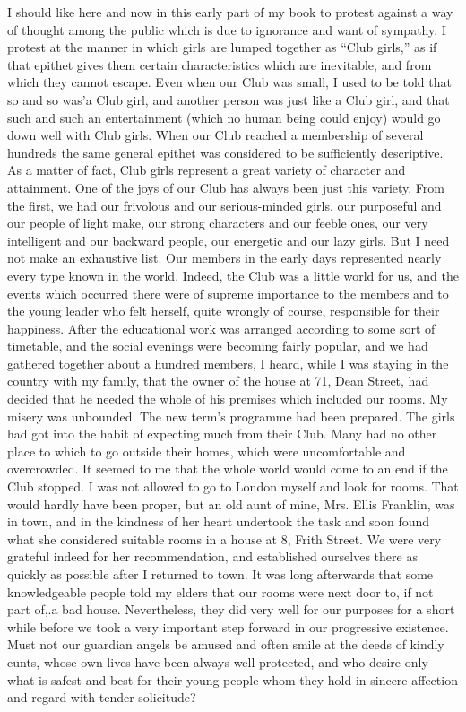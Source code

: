 I should like here and now in this early part of my
book to protest against a way of thought among the public
which is due to ignorance and want of sympathy. I protest at the manner in which girls are lumped together as
“Club girls,” as if that epithet gives them certain characteristics
which are inevitable, and from which they cannot
escape. Even when our Club was small, I used to be told
that so and so was’a Club girl, and another person was
just like a Club girl, and that such and such an entertainment
(which no human being could enjoy) would go
down well with Club girls. When our Club reached a
membership of several hundreds the same general epithet
was considered to be sufficiently descriptive. As a matter
of fact, Club girls represent a great variety of character
and attainment. One of the joys of our Club has always
been just this variety. From the first, we had our frivolous
and our serious-minded girls, our purposeful and our
people of light make, our strong characters and our feeble
ones, our very intelligent and our backward people, our
energetic and our lazy girls. But I need not make an
exhaustive list. Our members in the early days represented
nearly every type known in the world. Indeed,
the Club was a little world for us, and the events which
occurred there were of supreme importance to the members
and to the young leader who felt herself, quite
wrongly of course, responsible for their happiness.
After the educational work was arranged according
to some sort of timetable, and the social evenings were
becoming fairly popular, and we had gathered together
about a hundred members, I heard, while I was staying
in the country with my family, that the owner of the
house at 71, Dean Street, had decided that he needed
the whole of his premises which included our rooms. My
misery was unbounded. The new term’s programme had
been prepared. The girls had got into the habit of expecting
much from their Club. Many had no other place to
which to go outside their homes, which were uncomfortable
and overcrowded. It seemed to me that the whole
world would come to an end if the Club stopped. I was
not allowed to go to London myself and look for rooms.
That would hardly have been proper, but an old aunt
of mine, Mrs. Ellis Franklin, was in town, and in the kindness
of her heart undertook the task and soon found what
she considered suitable rooms in a house at 8, Frith Street.
We were very grateful indeed for her recommendation,
and established ourselves there as quickly as possible after
I returned to town. It was long afterwards that some
knowledgeable people told my elders that our rooms were
next door to, if not part of,.a bad house. Nevertheless,
they did very well for our purposes for a short while
before we took a very important step forward in our progressive
existence. Must not our guardian angels be
amused and often smile at the deeds of kindly eunts,
whose own lives have been always well protected, and
who desire only what is safest and best for their young
people whom they hold in sincere affection and regard
with tender solicitude?
